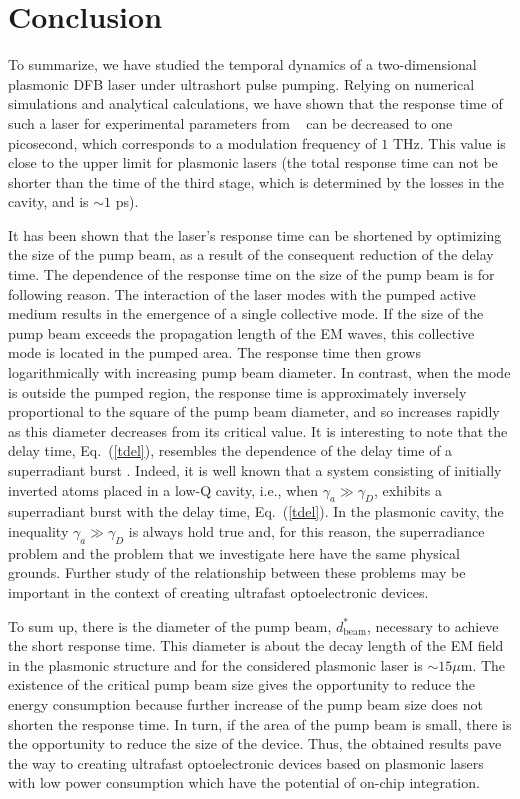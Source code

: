 \documentclass[aps,pra,amsmath,amssymb,onecolumn,superscriptaddress,showpacs,floatfix,]{revtex4-1}
\begin{document}
\section*{Conclusion}

To summarize, we have studied the temporal dynamics of a two-dimensional plasmonic DFB laser under ultrashort pulse pumping.
Relying on numerical simulations and analytical calculations, we have shown that the response time of such a laser for experimental parameters from ~\cite{TennerJOpt,TennerACSPhot} can be decreased to one picosecond, which corresponds to a modulation frequency of $1$ THz.
This value is close to the upper limit for plasmonic lasers (the total response time can not be shorter than the time of the third stage, which is determined by the losses in the cavity, and is $ \sim 1$ ps).

It has been shown that the laser's response time can be shortened by optimizing the size of the pump beam, as a result of the consequent reduction of the delay time.
The dependence of the response time on the size of the pump beam is for following reason.
The interaction of the laser modes with the pumped active medium results in the emergence of a single collective mode.
If the size of the pump beam exceeds the propagation length of the EM waves, this collective mode is located in the pumped area.
The response time then grows logarithmically with increasing pump beam diameter.
In contrast, when the mode is outside the pumped region, the response time is approximately inversely proportional to the square of the pump beam diameter, and so increases rapidly as this diameter decreases from its critical value.
It is interesting to note that the delay time, Eq.~(\ref{tdel}), resembles the dependence of the delay time of a superradiant burst \cite{gross1982superradiance, andreev1980collective,nefedkin2017badcavitySR}.
Indeed, it is well known \cite{gross1982superradiance, andreev1980collective} that a system consisting of initially inverted atoms placed in a low-Q cavity, i.e., when $\gamma_a \gg \gamma_D$, exhibits a superradiant burst with the delay time, Eq.~(\ref{tdel}). In the plasmonic cavity, the inequality $\gamma_a \gg \gamma_D$ is always hold true and, for this reason, the superradiance problem and the problem that we investigate here have the same physical grounds. Further study of the relationship between these problems may be important in the context of creating ultrafast optoelectronic devices.

To sum up, there is the diameter of the pump beam, $d_{\text{beam}}^*$, necessary to achieve the short response time. This diameter is about the decay length of the EM field in the plasmonic structure and for the considered plasmonic laser is $\sim 15 \mu$m. The existence of the critical pump beam size gives the opportunity to reduce the energy consumption because further increase of the pump beam size does not shorten the response time.
In turn, if the area of the pump beam is small, there is the opportunity to reduce the size of the device.
Thus, the obtained results pave the way to creating ultrafast optoelectronic devices based on plasmonic lasers with low power consumption which have the potential of on-chip integration.
\end{document}
